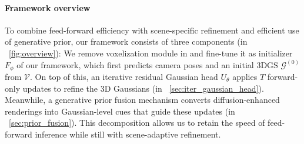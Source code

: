 \paragraph{Framework overview} 
To combine feed-forward efficiency with scene-specific refinement and efficient use of generative prior, our framework consists of three components (in ~\cref{fig:overview}): 
We remove voxelization module in \cite{jiang2025anysplat} and fine-tune it as initializer $F_\phi$ of our framework, which first predicts camera poses and an initial 3DGS $\mathcal{G}^{(0)}$ from $\mathcal{V}$. On top of this, an iterative residual Gaussian head $U_\theta$ applies $T$ forward-only updates to refine the 3D Gaussians (in ~\cref{sec:iter_gaussian_head}). Meanwhile, a generative prior fusion mechanism converts diffusion-enhanced renderings into Gaussian-level cues that guide these updates (in ~\cref{sec:prior_fusion}).
This decomposition allows us to retain the speed of feed-forward inference while still with scene-adaptive refinement.






